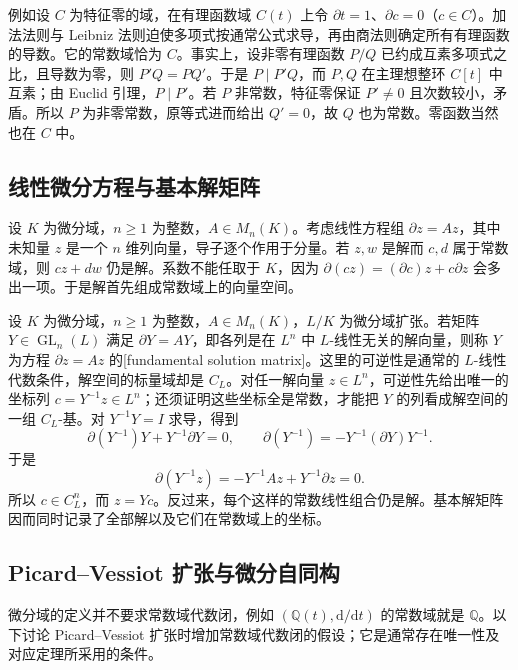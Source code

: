 \ProseParagraphBreak
例如设 \(C\) 为特征零的域，在有理函数域 \(C(t)\) 上令 \(\partial t=1\)、\(\partial c=0\)（\(c\in C\)）。加法法则与 Leibniz 法则迫使多项式按通常公式求导，再由商法则确定所有有理函数的导数。它的常数域恰为 \(C\)。事实上，设非零有理函数 \(P/Q\) 已约成互素多项式之比，且导数为零，则 \(P'Q=PQ'\)。于是 \(P\mid P'Q\)，而 \(P,Q\) 在主理想整环 \(C[t]\) 中互素；由 Euclid 引理，\(P\mid P'\)。若 \(P\) 非常数，特征零保证 \(P'\neq0\) 且次数较小，矛盾。所以 \(P\) 为非零常数，原等式进而给出 \(Q'=0\)，故 \(Q\) 也为常数。零函数当然也在 \(C\) 中。

\subsection{线性微分方程与基本解矩阵}
\label{b1:subsec:D03:02}

设 \(K\) 为微分域，\(n\geq1\) 为整数，\(A\in M_n(K)\)。考虑线性方程组 \(\partial z=Az\)，其中未知量 \(z\) 是一个 \(n\) 维列向量，导子逐个作用于分量。若 \(z,w\) 是解而 \(c,d\) 属于常数域，则 \(cz+dw\) 仍是解。系数不能任取于 \(K\)，因为 \(\partial(cz)=(\partial c)z+c\partial z\) 会多出一项。于是解首先组成常数域上的向量空间。

\ProseParagraphBreak
设 \(K\) 为微分域，\(n\geq1\) 为整数，\(A\in M_n(K)\)，\(L/K\) 为微分域扩张。若矩阵 \(Y\in\operatorname{GL}_n(L)\) 满足 \(\partial Y=AY\)，即各列是在 \(L^n\) 中 \(L\)-线性无关的解向量，则称 \(Y\) 为方程 \(\partial z=Az\) 的[fundamental solution matrix]。这里的可逆性是通常的 \(L\)-线性代数条件，解空间的标量域却是 \(C_L\)。对任一解向量 \(z\in L^n\)，可逆性先给出唯一的坐标列 \(c=Y^{-1}z\in L^n\)；还须证明这些坐标全是常数，才能把 \(Y\) 的列看成解空间的一组 \(C_L\)-基。对 \(Y^{-1}Y=I\) 求导，得到
\[
	\partial(Y^{-1})Y+Y^{-1}\partial Y=0, \qquad \partial(Y^{-1})=-Y^{-1}(\partial Y)Y^{-1}.
\]
于是
\[
	\partial(Y^{-1}z)=-Y^{-1}A z+Y^{-1}\partial z=0.
\]
所以 \(c\in C_L^n\)，而 \(z=Yc\)。反过来，每个这样的常数线性组合仍是解。基本解矩阵因而同时记录了全部解以及它们在常数域上的坐标。

\subsection{Picard--Vessiot 扩张与微分自同构}
\label{b1:subsec:D03:03}

微分域的定义并不要求常数域代数闭，例如 \((\mathbb Q(t),\mathrm{d}/\mathrm{d}t)\) 的常数域就是 \(\mathbb Q\)。以下讨论 Picard--Vessiot 扩张时增加常数域代数闭的假设；它是通常存在唯一性及对应定理所采用的条件。

